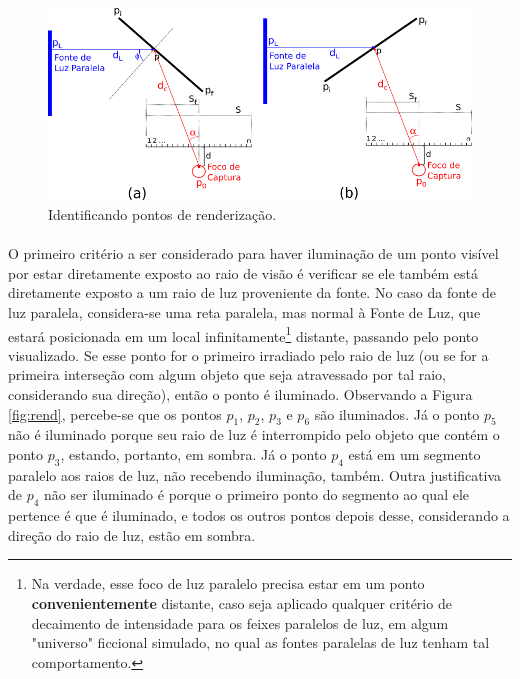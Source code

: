 \documentclass{article}
\begin{document}
	\begin{figure}[h]
		\centering
		\includegraphics[scale=0.7]{radiosity}
		\caption{Identificando pontos de renderização.}
		\label{fig:radio}
	\end{figure}

	\paragraph{}
	O primeiro critério a ser considerado para haver iluminação de um ponto visível por estar diretamente exposto ao raio de visão é verificar se ele também está diretamente exposto a um raio de luz proveniente da fonte. No caso da fonte de luz paralela, considera-se uma reta paralela, mas normal à Fonte de Luz, que estará posicionada em um local infinitamente\footnote{Na verdade, esse foco de luz paralelo precisa estar em um ponto \textbf{convenientemente} distante, caso seja aplicado qualquer critério de decaimento de intensidade para os feixes paralelos de luz, em algum "universo" ficcional simulado, no qual as fontes paralelas de luz tenham tal comportamento.} distante, passando pelo ponto visualizado. Se esse ponto for o primeiro irradiado pelo raio de luz (ou se for a primeira interseção com algum objeto que seja atravessado por tal raio, considerando sua direção), então o ponto é iluminado. Observando a Figura \ref{fig:rend}, percebe-se que os pontos $p_1$, $p_2$, $p_3$ e $p_6$ são iluminados. Já o ponto $p_5$ não é iluminado porque seu raio de luz é interrompido pelo objeto que contém o ponto $p_3$, estando, portanto, em sombra. Já o ponto $p_4$ está em um segmento paralelo aos raios de luz, não recebendo iluminação, também. Outra justificativa de $p_4$ não ser iluminado é porque o primeiro ponto do segmento ao qual ele pertence é que é iluminado, e todos os outros pontos depois desse, considerando a direção do raio de luz, estão em sombra. 
	
\end{document}
